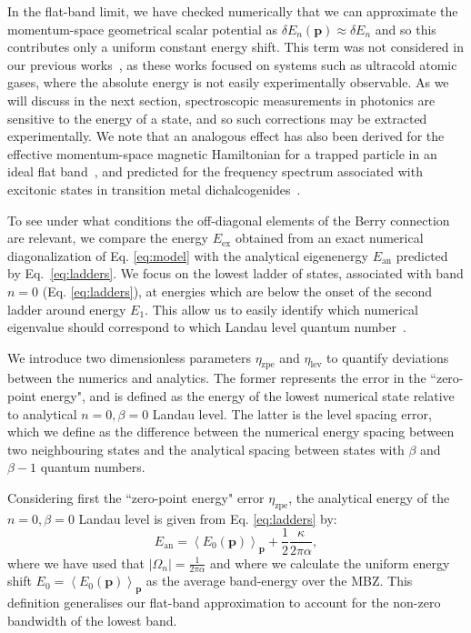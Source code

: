 \documentclass[twocolumn, 10pt, aps, superscriptaddress, floatfix, showpacs, pra, citeautoscript]{revtex4-1}
\newcommand{\vt}[1]{\mathbf{#1}}
\begin{document}
In the flat-band limit, we have checked numerically that we can approximate the momentum-space geometrical scalar potential as $\delta E_n(\vt{p}) \approx   \delta E_n$ and so this contributes only a uniform constant energy shift. This term was not considered in our previous works~\cite{price2014magnetic, ozawa2014momhh}, as these works focused on systems such as ultracold atomic gases, where the absolute energy is not easily experimentally observable. As we will discuss in the next section, spectroscopic measurements in photonics are sensitive to the energy of a state, and so such corrections may be extracted experimentally. We note that an analogous effect has also been derived for the effective momentum-space magnetic Hamiltonian for a trapped particle in an ideal flat band~\cite{Claassen_prl_2015}, and predicted for the frequency spectrum associated with excitonic states in transition metal dichalcogenides~\cite{srivastava:2015}.

To see under what conditions the off-diagonal elements of the Berry connection are relevant, we compare the energy $E_{\text{ex}}$ obtained from an exact numerical diagonalization of Eq. \ref{eq:model} with the analytical eigenenergy $  E_{\text{an}}$ predicted by Eq.~\eqref{eq:ladders}. We focus on the lowest ladder of states, associated with band $n=0$ (Eq. \ref{eq:ladders}), at energies which are below the onset of the second ladder around energy $E_1$. This allow us to easily identify which numerical eigenvalue should correspond to which Landau level quantum number~\cite{price2014magnetic}. 

We introduce two dimensionless parameters $\eta_{\text{zpe}}$ and $\eta_{\text{lev}}$ to quantify deviations between the numerics and analytics. The former represents the error in the ``zero-point energy", and is defined as the energy of the lowest numerical state relative to analytical $n=0, \beta=0$ Landau level. The latter is the level spacing error, which we define as the difference between the numerical energy spacing between two neighbouring states and the analytical spacing between states with $\beta$ and $\beta-1$ quantum numbers.  

Considering first the ``zero-point energy" error $\eta_{\text{zpe}}$, the analytical energy of the $n=0, \beta=0$ Landau level is given from Eq. \ref{eq:ladders} by:
%
\begin{equation}
  E_{\text{an}} = \left<E_0(\vt{p})\right>_{\vt{p}} + \frac{1}{2}\frac{\kappa}{2\pi\alpha} ,
\end{equation}
%
where we have used that $|\Omega_n| = \frac{1}{2\pi\alpha}$ and where we calculate the uniform energy shift $E_0=\left<E_0(\vt{p})\right>_{\vt{p}}$ as the average band-energy over the MBZ. This definition generalises our flat-band approximation to account for the non-zero bandwidth of the lowest band. 
\end{document}
